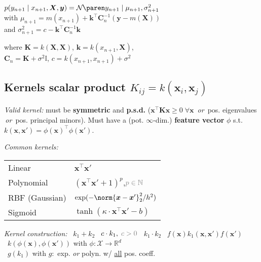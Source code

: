 $p(y_{n+1} \mid x_{n+1}, \bm X, \bm y) = \Gauss{y_{n+1} \mid \mu_{n+1}, \sigma_{n+1}^2}$\\\enskip
with $\mu_{n+1} = m(x_{n+1}) + \bm k^\top \bm C_n^{-1} (\bm y - m(\bm X))$\\\enskip
and $\sigma_{n+1}^2 = c - \bm k^\top \bm C_n^{-1} \bm k$

where
$\bm K = k(\bm X, \bm X)$,\enskip
$\bm k = k(x_{n+1}, \bm X)$,\\
\phantom{where}
$\bm C_n = \bm K + \sigma^2 \mathbb I$,\enskip
$c = k(x_{n+1}, x_{n+1}) + \sigma^2$

\subsection{Kernels \normalfont\sffamily
\quad scalar product
\quad $K_{ij} = k(\bm x_i, \bm x_j)$}

\emph{Valid kernel:}
must be
\textbf{symmetric}
and \textbf{p.s.d.}
    ($\bm x^\top \bm{Kx} \geq 0 \; \forall\bm x$ \textit{\,or\,}
    pos. eigenvalues \textit{\,or\,}
    pos. principal minors).\enskip
Must have a (pot. $\infty$-dim.) \textbf{feature vector} $\phi$ s.t. $k(\bm x, \bm x') = \phi(\bm x)^\top \phi(\bm x')$.

\iffalse
    Kernel $k(\bm x, \bm x')$ must be \emph{symmetric} ($\bm K^\top {=} \bm K$) and \emph{p.s.d.} ($\bm x^\top \bm{Kx} \geq 0 \; \forall\bm x$ \textit{\;or\;} pos. eigenvalues).
    
    A valid kernel $k$ must have a (potent. $\infty$-dim.) feature vector $\phi(\bm x)$ s.t. $k(\bm x, \bm x') = \phi^\top \! (\bm x) \phi (\bm x')$.
\fi

\emph{Common kernels:}\\
\begin{tabular}{@{}l @{:\hfill\enskip}l}
    Linear & $\bm x^\top \bm x'$ \\
    Polynomial & $(\bm x^\top \bm x' + 1)^p$,\enskip $\color{gray} p\in\mathbb N$ \\
    RBF (Gaussian) & $\exp(-\norm{\bm x - \bm x'}_2^2 / h^2)$ \\
    Sigmoid & $\tanh(\kappa \cdot \bm x^\top \bm x' - b)$
\end{tabular}

\emph{Kernel construction:}
\enskip\textbullet~$k_1 {+} k_2$
\enskip\textbullet~$c\cdot k_1, \; \color{gray} c>0$
\enskip\textbullet~$k_1\cdot k_2$
\enskip\textbullet~$f(\bm x) k_1(\bm x, \bm x') f(\bm x')$
\\\textbullet~$k(\phi(\bm x), \phi(\bm x'))$
    \enskip with $\phi : \mathcal X \to \mathbb R^d$
\\\textbullet~$g(k_1)$
    \enskip with $g :$ exp. \textit{ or } polyn. w/ \underline{all} pos. coeff.

